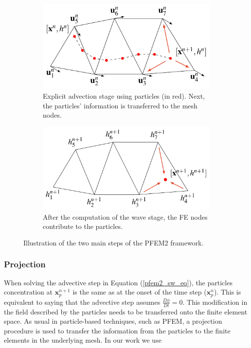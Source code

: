 \begin{figure} [htb]
\begin{subfigure}{0.48\textwidth}
    \centering
    \includegraphics[width=\textwidth]{img/lagrangian/pfem2_convection_stage.pdf}
    \caption{Explicit advection stage using particles (in red). Next, the particles' information is transferred to the mesh nodes.}
    \label{pfem2_convection_stage}
\end{subfigure}
\hfill
\begin{subfigure}{0.48\textwidth}
    \centering
    \includegraphics[width=\textwidth]{img/lagrangian/pfem2_wave_stage.pdf}
    \caption{After the computation of the wave stage, the FE nodes contribute to the particles.}
    \label{pfem2_wave_stage}
\end{subfigure}
\caption{Illustration of the two main steps of the PFEM2 framework.}
\label{pfem2_diffusion_and_wave_stages}
\end{figure}



\subsubsection{Projection}


When solving the advective step in Equation (\ref{pfem2_sw_eq}), the particles concentration at $\mathbf x_p^{n+1}$ is the same as at the onset of the time step ($\mathbf x_p^n$). This is equivalent to saying that the advective step assumes $\frac{D\phi}{D t}=0$. This modification in the field described by the particles needs to be transferred onto the finite element space. As usual in particle-based techniques, such as PFEM, a projection procedure is used to transfer the information from the particles to the finite elements in the underlying mesh. In our work we use

